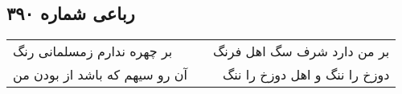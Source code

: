 \begin{center}
\section*{رباعی شماره ۳۹۰}
\label{sec:sh390}
\begin{longtable}{l p{0.5cm} r}
بر چهره ندارم زمسلمانی رنگ
&&
بر من دارد شرف سگ اهل فرنگ
\\
آن رو سیهم که باشد از بودن من
&&
دوزخ را ننگ و اهل دوزخ را ننگ
\\
\end{longtable}
\end{center}
